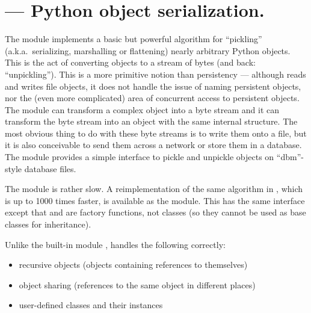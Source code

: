 \section{ ---
         Python object serialization.}




The  module implements a basic but powerful algorithm for
``pickling'' (a.k.a.\ serializing, marshalling or flattening) nearly
arbitrary Python objects.  This is the act of converting objects to a
stream of bytes (and back: ``unpickling'').
This is a more primitive notion than
persistency --- although  reads and writes file objects,
it does not handle the issue of naming persistent objects, nor the
(even more complicated) area of concurrent access to persistent
objects.  The  module can transform a complex object into
a byte stream and it can transform the byte stream into an object with
the same internal structure.  The most obvious thing to do with these
byte streams is to write them onto a file, but it is also conceivable
to send them across a network or store them in a database.  The module
 provides a simple interface to pickle and unpickle
objects on ``dbm''-style database files.

 The  module is rather slow.  A
reimplementation of the same algorithm in \C{}, which is up to 1000 times
faster, is available as the 
module.  This has the same interface except that  and
 are factory functions, not classes (so they cannot be
used as base classes for inheritance).

Unlike the built-in module ,  handles
the following correctly:

\begin{itemize}

\item recursive objects (objects containing references to themselves)

\item object sharing (references to the same object in different places)

\item user-defined classes and their instances

\end{itemize}

